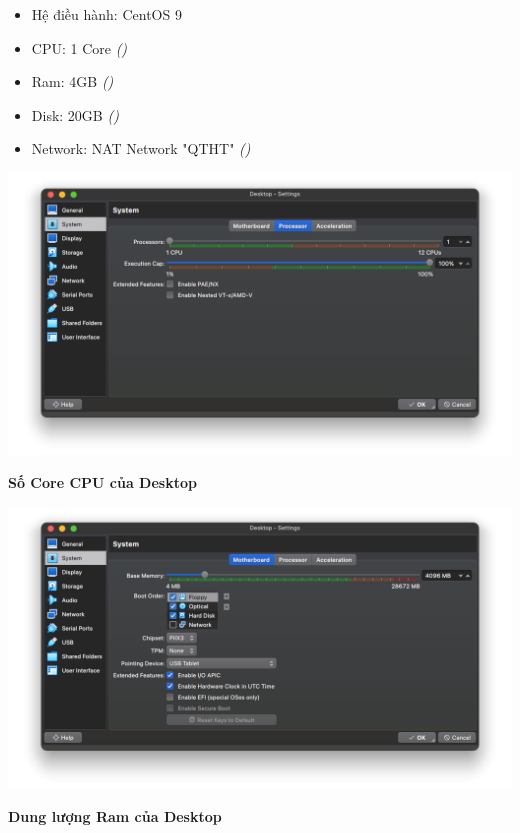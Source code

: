 \begin{itemize}
  \item Hệ điều hành: CentOS 9
  \item CPU: 1 Core \textit{()}
  \item Ram: 4GB \textit{()}
  \item Disk: 20GB \textit{()}
  \item Network: NAT Network "QTHT" \textit{()}
\end{itemize}

\begin{minipage}{.93\linewidth}
  \captionsetup{type=figure}
  \includegraphics[width=\linewidth]{./imgs/Hinh-9.png}
  \caption{\bfseries Số Core CPU của Desktop}
  \label{fig:desktop-processor}
\end{minipage}



\begin{minipage}{.93\linewidth}
  \captionsetup{type=figure}
  \includegraphics[width=\linewidth]{./imgs/Hinh-8.png}
  \caption{\bfseries Dung lượng Ram của Desktop}
  \label{fig:desktop-ram}
\end{minipage}


